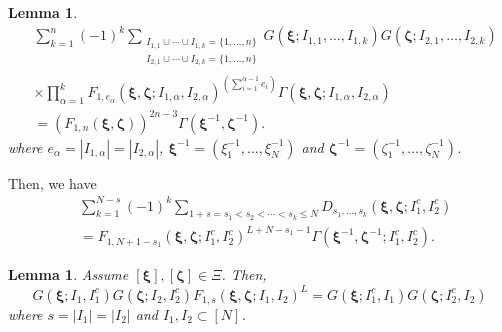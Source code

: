 \documentclass[a4paper,11pt]{article}
\newtheorem{lemma}[theorem]{Lemma}
\theoremstyle{definition}
\begin{document}
\begin{lemma}\label{c:LSW20L6.3}
    \begin{equation}
    \begin{split}
    &\sum_{k=1}^n(-1)^k\sum_{\substack{I_{1,1}\cup\cdots\cup I_{1,k}=\{1,\ldots,n\}\\I_{2,1}\cup\cdots\cup I_{2,k}=\{1,\ldots,n\}}} G(\boldsymbol{\xi};I_{1,1},\ldots,I_{1,k})G(\boldsymbol{\zeta};I_{2,1},\ldots,I_{2,k})\\&\times\prod_{\alpha=1}^kF_{1,e_{\alpha}}(\boldsymbol{\xi},\boldsymbol{\zeta};I_{1,\alpha}, I_{2,\alpha})^{\left(\sum_{i=1}^{\alpha-1}e_i \right)}\Gamma(\boldsymbol{\xi},\boldsymbol{\zeta}; I_{1, \alpha}, I_{2, \alpha})\\
    &= \left(F_{1,n}(\boldsymbol{\xi},\boldsymbol{\zeta}) \right)^{2n-3}\Gamma(\boldsymbol{\xi}^{-1},\boldsymbol{\zeta}^{-1}).
    \end{split}
    \end{equation}
where $e_{\alpha} = |I_{1, \alpha}| = |I_{2, \alpha}| $, $\boldsymbol{\xi}^{-1} = (\xi_1^{-1}, \dots, \xi_N^{-1})$ and $\boldsymbol{\zeta}^{-1} = (\zeta_1^{-1}, \dots, \zeta_N^{-1})$.
\end{lemma}

Then, we have
\begin{equation}\label{e:DsDecompFinal}
\begin{split}
    &\sum_{k=1}^{N-s} (-1)^k \sum_{1+s =s_1< s_2 <\cdots < s_k \leq N} D_{s_1, \dots, s_k}(\boldsymbol{\xi}, \boldsymbol{\zeta}; I_1^c, I_2^c)\\
    &= F_{1, N+1-s_1}(\boldsymbol{\xi}, \boldsymbol{\zeta}; I_1^c, I_2^c)^{L+N-s_1-1} \Gamma(\boldsymbol{\xi}^{-1}, \boldsymbol{\zeta}^{-1}; I_1^c, I_2^c).
\end{split}    
\end{equation}



\begin{lemma}\label{l:GGF^L to GG}
Assume $[\boldsymbol{\xi}],[\boldsymbol{\zeta}] \in \Xi$. Then,
\begin{equation}
    G(\boldsymbol{\xi}; I_1,I_1^c )G(\boldsymbol{\zeta}; I_2,I_2^c ) F_{1, s}(\boldsymbol{\xi}, \boldsymbol{\zeta}; I_1, I_2)^L = G(\boldsymbol{\xi}; I_1^c, I_1) G(\boldsymbol{\zeta}; I_2^c, I_2) 
\end{equation}
where $s = |I_1|= |I_2|$ and $I_1, I_2 \subset [N]$.
\end{lemma}
\end{document}
